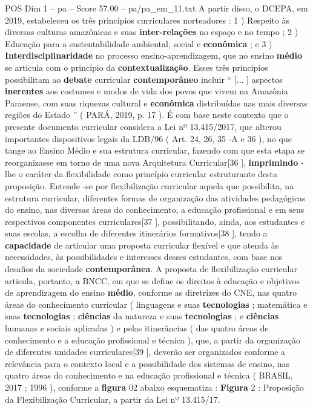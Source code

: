\begin{textsample}{POS Dim 1 – pa – Score 57.00 – pa/pa\_em\_11.txt}
A partir disso, o DCEPA, em 2019, estabeleceu os três princípios curriculares norteadores : 1 ) Respeito às diversas culturas amazônicas e suas \textbf{inter-relações} no espaço e no tempo ; 2 ) Educação para a sustentabilidade ambiental, social e \textbf{econômica} ; e 3 ) \textbf{Interdisciplinaridade} no processo ensino-aprendizagem, que no ensino \textbf{médio} se articula com o princípio da \textbf{contextualização}.
Esses três princípios possibilitam ao \textbf{debate} curricular \textbf{contemporâneo} incluir “ [... ] aspectos \textbf{inerentes} aos costumes e modos de vida dos povos que vivem na Amazônia Paraense, com suas riquezas cultural e \textbf{econômica} distribuídas nas mais diversas regiões do Estado ” ( PARÁ, 2019, p. 17 ).
É com base neste contexto que o presente documento curricular considera a Lei nº 13.415/2017, que alterou importantes dispositivos legais da LDB/96 ( Art. 24, 26, 35 -A e 36 ), no que tange ao Ensino Médio e sua estrutura curricular, fazendo com que esta etapa se reorganizasse em torno de uma nova Arquitetura Curricular[36 ], \textbf{imprimindo} -lhe o caráter da flexibilidade como princípio curricular estruturante desta proposição.
Entende -se por flexibilização curricular aquela que possibilita, na estrutura curricular, diferentes formas de organização das atividades pedagógicas do ensino, nas diversas áreas do conhecimento, a educação profissional e em seus respectivos componentes curriculares[37 ], possibilitando, ainda, aos estudantes e suas escolas, a escolha de diferentes itinerários formativos[38 ], tendo a \textbf{capacidade} de articular uma proposta curricular flexível e que atenda às necessidades, às possibilidades e interesses desses estudantes, com base nos desafios da sociedade \textbf{contemporânea}.
A proposta de flexibilização curricular articula, portanto, a BNCC, em que se define os direitos à educação e objetivos de aprendizagem do ensino \textbf{médio}, conforme as diretrizes do CNE, nas quatro áreas do conhecimento curricular ( linguagens e suas \textbf{tecnologias} ; matemática e suas \textbf{tecnologias} ; \textbf{ciências} da natureza e suas \textbf{tecnologias} ; e \textbf{ciências} humanas e sociais aplicadas ) e pelas itinerâncias ( das quatro áreas de conhecimento e a educação profissional e técnica ), que, a partir da organização de diferentes unidades curriculares[39 ], deverão ser organizados conforme a relevância para o contexto local e a possibilidade dos sistemas de ensino, nas quatro áreas do conhecimento e na educação profissional e técnica ( BRASIL, 2017 ; 1996 ), conforme a \textbf{figura} 02 abaixo esquematiza : \textbf{Figura} 2 : Proposição da Flexibilização Curricular, a partir da Lei nº 13.415/17.

\end{textsample}
